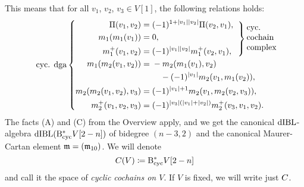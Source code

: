 \documentclass[\MainFolder/Text.tex]{subfiles}
\begin{document}
This means that for all $v_1$, $v_2$, $v_3 \in V[1]$, the following relations holds:
\begin{equation}\label{Eq:CycDGA}{\hbadness=10000 \text{cyc. dga}\left\{ \begin{aligned} \Pair(v_1,v_2) &= (-1)^{1+ \Abs{v_1} \Abs{v_2}} \Pair(v_2, v_1), &
\mathclap{
\smash{
\raisebox{-0.58cm}{$
\hspace{-0.8cm}
\left.\begin{aligned}\mathstrut\\ \mathstrut\\ \mathstrut \end{aligned}\right\}
\text{\parbox{5em}{cyc. cochain complex}}
$}}}
\\
m_1(m_1(v_1)) &= 0, &\\
m_1^+(v_1, v_2) &= (-1)^{\Abs{v_1}\Abs{v_2}} m_1^+(v_2, v_1), &\\
 m_1(m_2(v_1,v_2)) &= \begin{multlined}[t]- m_2(m_1(v_1),v_2)  \\ - (-1)^{\Abs{v_1}} m_2(v_1,m_1(v_2)), \end{multlined} &\\
m_2(m_2(v_1, v_2), v_3) &= (-1)^{\Abs{v_1} + 1} m_2(v_1,m_2(v_2,v_3)), &\\
m_2^+(v_1, v_2, v_3) &= (-1)^{\Abs{v_3}(\Abs{v_1}+\Abs{v_2})}m_2^+(v_3, v_1, v_2).
\end{aligned}\right.}
\end{equation}
The facts (A) and (C) from the Overview apply, and we get the canonical $\mathrm{dIBL}$-algebra $\mathrm{dIBL}(\mathrm{B}_{\mathrm{cyc}}^* V[2-n])$ of bidegree $(n-3,2)$ and the canonical Maurer-Cartan element $\mathfrak{m} = (\mathfrak{m}_{10})$. We will denote
$$ C(V)\coloneqq \mathrm{B}_{\mathrm{cyc}}^* V[2-n] $$
and call it the space of \emph{cyclic cochains on $V$}. If $V$ is fixed, we will write just $C$.
\end{document}

